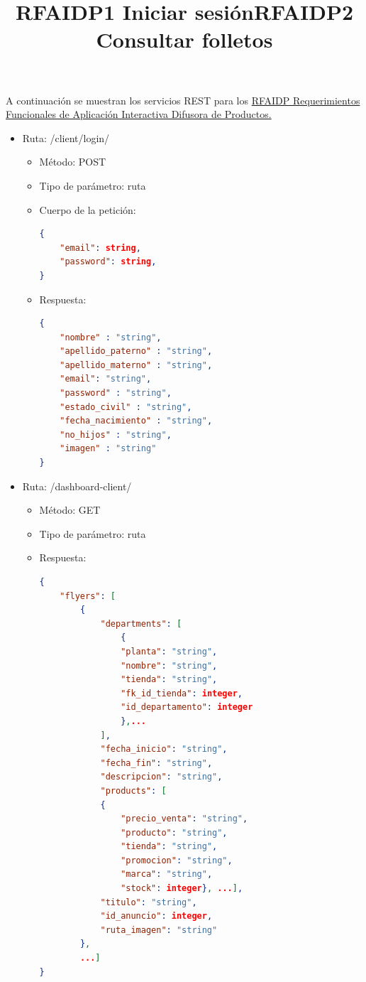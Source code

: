A continuación se muestran los servicios REST para los \hyperlink{RFAIDP}{RFAIDP Requerimientos Funcionales de Aplicación Interactiva Difusora de Productos.}\\ \par 
\title{\textbf{RFAIDP1 Iniciar sesión}}
\begin{itemize}
\item Ruta: /client/login/
\begin{itemize}
\item Método: POST
\item Tipo de parámetro: ruta
\item Cuerpo de la petición:
\begin{lstlisting}[language=json,firstnumber=1]
{
	"email": string, 
	"password": string,
}
\end{lstlisting}
\item Respuesta: 
\begin{lstlisting}[language=json,firstnumber=1]
{
    "nombre" : "string",
	"apellido_paterno" : "string",
	"apellido_materno" : "string",
	"email": "string", 
	"password" : "string",
	"estado_civil" : "string",
	"fecha_nacimiento" : "string", 
	"no_hijos" : "string",
	"imagen" : "string"
}
\end{lstlisting}
\end{itemize}
\end{itemize}
\title{\textbf{RFAIDP2 Consultar folletos}}
\begin{itemize}
\item Ruta: /dashboard-client/
\begin{itemize}
\item Método: GET
\item Tipo de parámetro: ruta
\item Respuesta: 
\begin{lstlisting}[language=json,firstnumber=1]
{
    "flyers": [
        {
            "departments": [
				{
				"planta": "string",
                "nombre": "string",
                "tienda": "string",
                "fk_id_tienda": integer,
                "id_departamento": integer
				},...
            ],
            "fecha_inicio": "string",
            "fecha_fin": "string",
            "descripcion": "string",
            "products": [
            {
            	"precio_venta": "string",
                "producto": "string",
                "tienda": "string",
                "promocion": "string",
                "marca": "string",
                "stock": integer}, ...],
            "titulo": "string",
            "id_anuncio": integer,
            "ruta_imagen": "string"
        },
        ...]
}
\end{lstlisting}
\end{itemize}
\end{itemize}
